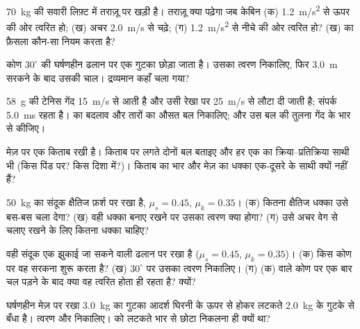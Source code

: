 \begin{exercise}[$\star$]\label{exo:g12:newtons-laws:2}
\qty{70}{kg} की सवारी लिफ़्ट में तराज़ू पर खड़ी है। तराज़ू क्या पढ़ेगा जब केबिन
(क) \qty{1.2}{m/s^2} से ऊपर की ओर त्वरित हो; (ख) अचर \qty{2.0}{m/s} से चढ़े; (ग) \qty{1.2}{m/s^2} से
नीचे की ओर त्वरित हो? (ख) का फ़ैसला कौन-सा नियम करता है?
\end{exercise}

\begin{exercise}[$\star$]\label{exo:g12:newtons-laws:3}
कोण $30^\circ$ की घर्षणहीन ढलान पर एक गुटका छोड़ा जाता है। उसका त्वरण निकालिए,
फिर \qty{3.0}{m} सरकने के बाद उसकी चाल। द्रव्यमान कहाँ चला गया?
\end{exercise}

\begin{exercise}[$\star$]\label{exo:g12:newtons-laws:4}
\qty{58}{g} की टेनिस गेंद \qty{15}{m/s} से आती है और उसी रेखा पर \qty{25}{m/s} से लौटा दी
जाती है; संपर्क \qty{5.0}{ms} रहता है।  का बदलाव और तारों का औसत
बल निकालिए; और उस बल की तुलना गेंद के भार से
कीजिए।
\end{exercise}

\begin{exercise}[$\star$]\label{exo:g12:newtons-laws:5}
मेज़ पर एक किताब रखी है। किताब पर लगते दोनों बल बताइए और हर एक का
क्रिया--प्रतिक्रिया साथी भी (किस पिंड पर? किस दिशा में?)। किताब का भार
और मेज़ का धक्का एक-दूसरे के साथी क्यों नहीं हैं?
\end{exercise}

\begin{exercise}[$\star\star$]\label{exo:g12:newtons-laws:6}
\qty{50}{kg} का संदूक क्षैतिज फ़र्श पर रखा है, $\mu_s = 0.45$, $\mu_k = 0.35$। (क) कितना क्षैतिज
धक्का उसे बस-बस चला देगा? (ख) वही धक्का बनाए रखने पर उसका त्वरण क्या होगा?
(ग) उसे अचर वेग से चलाए रखने के लिए कितना धक्का चाहिए?
\end{exercise}

\begin{exercise}[$\star\star$]\label{exo:g12:newtons-laws:7}
वही संदूक एक झुकाई जा सकने वाली ढलान पर रखा है ($\mu_s = 0.45$, $\mu_k = 0.35$)। (क) किस
कोण पर वह सरकना शुरू करता है? (ख) $30^\circ$ पर उसका त्वरण निकालिए। (ग) (क) वाले
कोण पर एक बार चल पड़ने के बाद क्या वह त्वरित होता ही रहता है? क्यों?
\end{exercise}

\begin{exercise}[$\star\star$]\label{exo:g12:newtons-laws:8}
घर्षणहीन मेज़ पर रखा \qty{3.0}{kg} का गुटका आदर्श घिरनी के ऊपर से होकर लटकते
\qty{2.0}{kg} के गुटके से बँधा है। त्वरण और  निकालिए।  को
लटकते भार से छोटा निकलना ही क्यों था?
\end{exercise}

